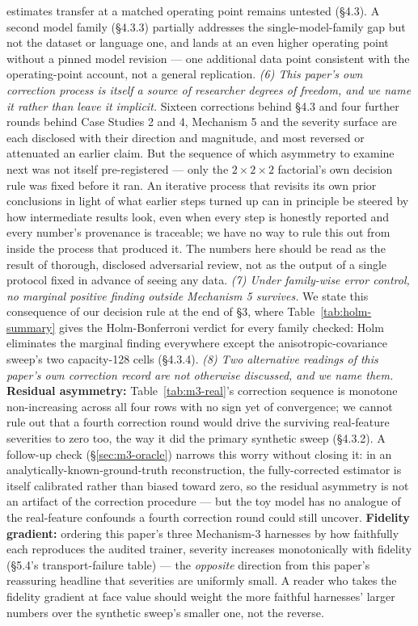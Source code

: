 \documentclass[10pt]{article} %
\begin{document}
estimates transfer at a matched operating point remains untested (§4.3). A
second model family (§4.3.3) partially addresses the single-model-family gap
but not the dataset or language one, and lands at an even higher operating
point without a pinned model revision --- one additional data point
consistent with the operating-point account, not a general replication.
\emph{(6) This paper's own correction process is itself a source of
researcher degrees of freedom, and we name it rather than leave it implicit.}
Sixteen corrections behind §4.3 and four further rounds behind Case Studies 2
and 4, Mechanism 5 and the severity surface are each disclosed with their
direction and magnitude, and most reversed or attenuated an earlier claim.
But the sequence of which asymmetry to examine next was not itself
pre-registered --- only the $2\times2\times2$ factorial's own decision rule
was fixed before it ran. An iterative process that revisits its own prior
conclusions in light of what earlier steps turned up can in principle be
steered by how intermediate results look, even when every step is honestly
reported and every number's provenance is traceable; we have no way to rule
this out from inside the process that produced it. The numbers here should be
read as the result of thorough, disclosed adversarial review, not as the
output of a single protocol fixed in advance of seeing any data.
\emph{(7) Under family-wise error control, no marginal positive finding
outside Mechanism 5 survives.} We state this consequence of our decision
rule at the end of §3, where Table~\ref{tab:holm-summary} gives the
Holm-Bonferroni verdict for every family checked: Holm eliminates the
marginal finding everywhere except the anisotropic-covariance sweep's two
capacity-128 cells (§4.3.4).
\emph{(8) Two alternative readings of this paper's own correction record are
not otherwise discussed, and we name them.} \textbf{Residual asymmetry:}
Table~\ref{tab:m3-real}'s correction sequence is monotone non-increasing
across all four rows with no sign yet of convergence; we cannot rule out
that a fourth correction round would drive the surviving real-feature
severities to zero too, the way it did the primary synthetic sweep (§4.3.2).
A follow-up check (§\ref{sec:m3-oracle}) narrows this worry without closing
it: in an analytically-known-ground-truth reconstruction, the
fully-corrected estimator is itself calibrated rather than biased toward
zero, so the residual asymmetry is not an artifact of the correction
procedure --- but the toy model has no analogue of the real-feature confounds
a fourth correction round could still uncover. \textbf{Fidelity gradient:}
ordering this paper's three Mechanism-3 harnesses by how faithfully each
reproduces the audited trainer, severity increases monotonically with
fidelity (§5.4's transport-failure table) --- the \emph{opposite} direction
from this paper's reassuring headline that severities are uniformly small. A
reader who takes the fidelity gradient at face value should weight the more
faithful harnesses' larger numbers over the synthetic sweep's smaller one,
not the reverse.
\end{document}
